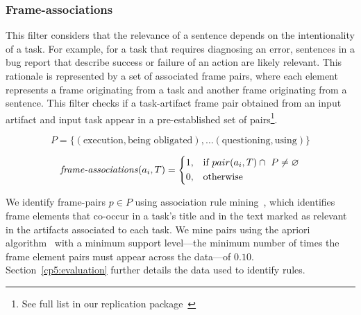 \subsubsection{Frame-associations}

This filter considers that the relevance of a sentence depends on the intentionality of a task. 
For example, for a task that requires diagnosing an error, sentences in a bug report that describe success or failure 
of an action are likely relevant. 
This rationale is represented by a set of associated frame pairs, where each element represents a frame originating from a task and another frame originating from a sentence.
This filter checks if a task-artifact frame pair obtained from an input artifact and input task appear in a pre-established set of pairs\footnote{See full list in our replication package~\cite{dsandroid}}.


\begin{small}
\begin{equation}
P = \{ (\text{execution}, \text{being obligated}), \dots (\text{questioning}, \text{using}) \} 
\end{equation}

\begin{equation}
\text{\textit{frame-associations}}(a_i, T) = \left \{
\begin{aligned}
    &1, && \text{if}\ pair(a_i, T) \cap ~P \ne \emptyset \\
    &0, && \text{otherwise}
\end{aligned} \right.
\end{equation} 
\end{small}



We identify frame-pairs $p \in P$ using association rule mining~\cite{agrawal1994apriori}, which identifies 
frame elements that co-occur in a task's title and in the text marked as relevant in the artifacts associated to each task.
We mine pairs using the apriori algorithm~\cite{apriori-python} with a minimum support level---the minimum number of times the frame element
pairs must appear across the data---of $0.10$. Section~\ref{cp5:evaluation} further details the data used to identify rules.









